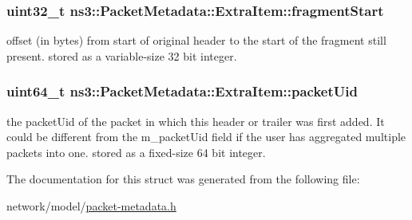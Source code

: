 \subsubsection[{\texorpdfstring{fragment\+Start}{fragmentStart}}]{\setlength{\rightskip}{0pt plus 5cm}uint32\+\_\+t ns3\+::\+Packet\+Metadata\+::\+Extra\+Item\+::fragment\+Start}\hypertarget{structns3_1_1PacketMetadata_1_1ExtraItem_aee94f5fc9de7e06392bead6c000692aa}{}\label{structns3_1_1PacketMetadata_1_1ExtraItem_aee94f5fc9de7e06392bead6c000692aa}
offset (in bytes) from start of original header to the start of the fragment still present. stored as a variable-\/size 32 bit integer. 
\subsubsection[{\texorpdfstring{packet\+Uid}{packetUid}}]{\setlength{\rightskip}{0pt plus 5cm}uint64\+\_\+t ns3\+::\+Packet\+Metadata\+::\+Extra\+Item\+::packet\+Uid}\hypertarget{structns3_1_1PacketMetadata_1_1ExtraItem_aab7c006def71126ef7608b3dc4b001f0}{}\label{structns3_1_1PacketMetadata_1_1ExtraItem_aab7c006def71126ef7608b3dc4b001f0}
the packet\+Uid of the packet in which this header or trailer was first added. It could be different from the m\+\_\+packet\+Uid field if the user has aggregated multiple packets into one. stored as a fixed-\/size 64 bit integer. 

The documentation for this struct was generated from the following file\+:\begin{DoxyCompactItemize}
\item 
network/model/\hyperlink{packet-metadata_8h}{packet-\/metadata.\+h}\end{DoxyCompactItemize}
